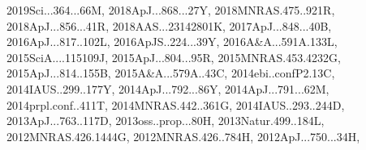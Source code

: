\documentclass[12pt]{article}
\begin{document}
\begin{enumerate}
\begin{enumerate}
{2019Sci...364...66M,%
2018ApJ...868...27Y,%
2018MNRAS.475..921R,%
2018ApJ...856...41R,%
2018AAS...23142801K,%
2017ApJ...848...40B,%
2016ApJ...817..102L,%
2016ApJS..224...39Y,%
2016A&A...591A.133L,%
2015SciA....115109J,%
2015ApJ...804...95R,%
2015MNRAS.453.4232G,%
2015ApJ...814..155B,%
2015A&A...579A..43C,%
2014ebi..confP2.13C,%
2014IAUS..299..177Y,%
2014ApJ...792...86Y,%
2014ApJ...791...62M,%
2014prpl.conf..411T,%
2014MNRAS.442..361G,%
2014IAUS..293..244D,%
2013ApJ...763..117D,%
2013oss..prop...80H,%
2013Natur.499..184L,%
2012MNRAS.426.1444G,%
2012MNRAS.426..784H,%
2012ApJ...750...34H,%
}
\end{enumerate}
\end{enumerate}
\end{document}
